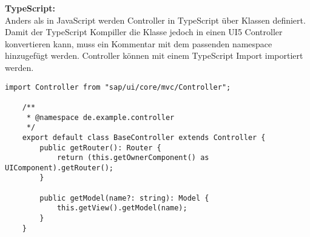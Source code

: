 \textbf{TypeScript:} \\
Anders als in JavaScript werden Controller in TypeScript über Klassen definiert. 
Damit der TypeScript Kompiller die Klasse jedoch in einen UI5 Controller konvertieren kann, muss ein Kommentar mit dem passenden namespace hinzugefügt werden.
Controller können mit einem TypeScript Import importiert werden.
\begin{lstlisting}[caption={Beispiel: TypeScript BaseController.ts}, ]
    import Controller from "sap/ui/core/mvc/Controller";

    /**
     * @namespace de.example.controller
     */
    export default class BaseController extends Controller {
        public getRouter(): Router {
            return (this.getOwnerComponent() as UIComponent).getRouter();
        }

        public getModel(name?: string): Model {
            this.getView().getModel(name);
        }
    }
\end{lstlisting}
